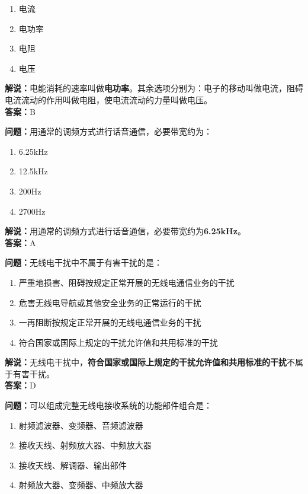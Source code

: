 \documentclass{ctexbook}
\begin{document}
\begin{enumerate}[label=\Alph*), leftmargin=3em]
	\item 电流
	\item 电功率
	\item 电阻
	\item 电压
\end{enumerate}

\noindent\textbf{解说：}电能消耗的速率叫做\textbf{电功率}。其余选项分别为：电子的移动叫做电流，阻碍电流流动的作用叫做电阻，使电流流动的力量叫做电压。\\\noindent\textbf{答案：}B


\bigskip


\noindent\textbf{问题：}用通常的调频方式进行话音通信，必要带宽约为：

\begin{enumerate}[label=\Alph*), leftmargin=3em]
	\item 6.25kHz
	\item 12.5kHz
	\item 200Hz
	\item 2700Hz
\end{enumerate}

\noindent\textbf{解说：}用通常的调频方式进行话音通信，必要带宽约为\textbf{6.25kHz}。\\\noindent\textbf{答案：}A%


\bigskip


\noindent\textbf{问题：}无线电干扰中不属于有害干扰的是：

\begin{enumerate}[label=\Alph*), leftmargin=3em]
	\item 严重地损害、阻碍按规定正常开展的无线电通信业务的干扰
	\item 危害无线电导航或其他安全业务的正常运行的干扰
	\item 一再阻断按规定正常开展的无线电通信业务的干扰
	\item 符合国家或国际上规定的干扰允许值和共用标准的干扰
\end{enumerate}

\noindent\textbf{解说：}无线电干扰中，\textbf{符合国家或国际上规定的干扰允许值和共用标准的干扰}不属于有害干扰。\\\noindent\textbf{答案：}D%


\bigskip


\noindent\textbf{问题：}可以组成完整无线电接收系统的功能部件组合是：

\begin{enumerate}[label=\Alph*), leftmargin=3em]
	\item 射频滤波器、变频器、音频滤波器
	\item 接收天线、射频放大器、中频放大器
	\item 接收天线、解调器、输出部件
	\item 射频放大器、变频器、中频放大器
\end{enumerate}
\end{document}
